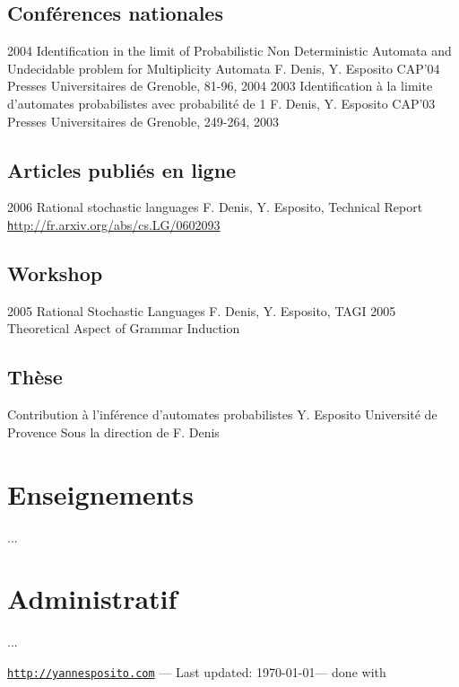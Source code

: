 \subsection*{Conférences nationales}

\article
{2004}
{Identification in the limit of Probabilistic Non Deterministic Automata and Undecidable problem for Multiplicity Automata}
{F. Denis, Y. Esposito}
{CAP'04}
{Presses Universitaires de Grenoble, 81-96, 2004}
\article
{2003}
{Identification à la limite d'automates probabilistes avec probabilité de 1}
{F. Denis, Y. Esposito}
{CAP'03}
{Presses Universitaires de Grenoble, 249-264, 2003}

\subsection*{Articles publiés en ligne}

\article
{2006}
{Rational stochastic languages}
{ F. Denis, Y. Esposito,}
{Technical Report}
{\href{http://fr.arxiv.org/abs/cs.LG/0602093}{\texttt http://fr.arxiv.org/abs/cs.LG/0602093}}

\subsection*{Workshop}

\article
{2005}
{Rational Stochastic Languages}
{ F. Denis, Y. Esposito,}
{TAGI 2005}
{Theoretical Aspect of Grammar Induction}

\subsection*{Thèse}
{Contribution à l'inférence d'automates probabilistes}
{Y. Esposito}
{Université de Provence}
{Sous la direction de F. Denis}

\section*{Enseignements}

...

\section*{Administratif}

...

\vfill{}
\hrulefill
\begin{center}
{\footnotesize \href{http://yannesposito.com}{\texttt{\protect http://yannesposito.com}} — Last updated: \today — done with \XeLaTeX }
\end{center}



